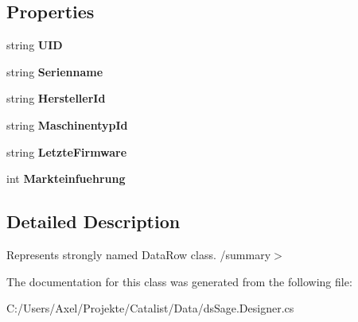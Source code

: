 \subsection*{Properties}
\begin{DoxyCompactItemize}
\item 
string {\bfseries U\+ID}\hypertarget{class_products_1_1_data_1_1ds_sage_1_1_maschinenserie_row_a0b16ab1bb876018db4ad000c1f56a617}{}\label{class_products_1_1_data_1_1ds_sage_1_1_maschinenserie_row_a0b16ab1bb876018db4ad000c1f56a617}

\item 
string {\bfseries Serienname}\hypertarget{class_products_1_1_data_1_1ds_sage_1_1_maschinenserie_row_a10452d6b3738ee43076e773429698100}{}\label{class_products_1_1_data_1_1ds_sage_1_1_maschinenserie_row_a10452d6b3738ee43076e773429698100}

\item 
string {\bfseries Hersteller\+Id}\hypertarget{class_products_1_1_data_1_1ds_sage_1_1_maschinenserie_row_af52bb14f7240db8a01b5d19d60c96419}{}\label{class_products_1_1_data_1_1ds_sage_1_1_maschinenserie_row_af52bb14f7240db8a01b5d19d60c96419}

\item 
string {\bfseries Maschinentyp\+Id}\hypertarget{class_products_1_1_data_1_1ds_sage_1_1_maschinenserie_row_a4cc66ebbf647df58df4f8231463f27c1}{}\label{class_products_1_1_data_1_1ds_sage_1_1_maschinenserie_row_a4cc66ebbf647df58df4f8231463f27c1}

\item 
string {\bfseries Letzte\+Firmware}\hypertarget{class_products_1_1_data_1_1ds_sage_1_1_maschinenserie_row_acfd69c600c8a503ff2af99450e034a57}{}\label{class_products_1_1_data_1_1ds_sage_1_1_maschinenserie_row_acfd69c600c8a503ff2af99450e034a57}

\item 
int {\bfseries Markteinfuehrung}\hypertarget{class_products_1_1_data_1_1ds_sage_1_1_maschinenserie_row_ad2574b717f13966f51836ee459f03244}{}\label{class_products_1_1_data_1_1ds_sage_1_1_maschinenserie_row_ad2574b717f13966f51836ee459f03244}

\end{DoxyCompactItemize}


\subsection{Detailed Description}
Represents strongly named Data\+Row class. /summary$>$ 

The documentation for this class was generated from the following file\+:\begin{DoxyCompactItemize}
\item 
C\+:/\+Users/\+Axel/\+Projekte/\+Catalist/\+Data/ds\+Sage.\+Designer.\+cs\end{DoxyCompactItemize}
